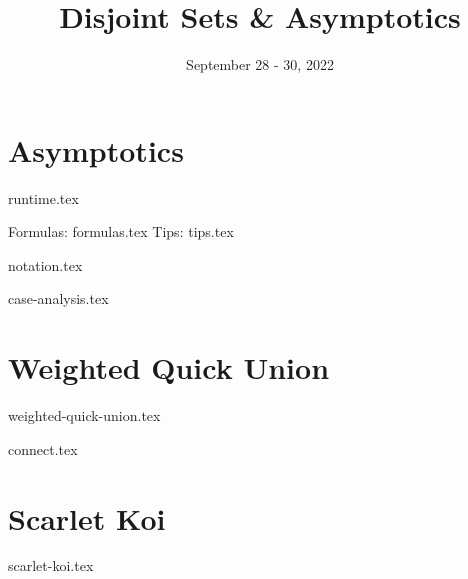 \documentclass[11pt]{exam}
\title{Disjoint Sets \& Asymptotics}
\date{September 28 - 30, 2022}
\begin{document}
\maketitle

\section{Asymptotics}
\begin{questions}
{runtime.tex}

Formulas:
{formulas.tex}
Tips:
{tips.tex}

{notation.tex}

{case-analysis.tex}
\end{questions}

\clearpage

\section{Weighted Quick Union}
{weighted-quick-union.tex}

\begin{questions}
{connect.tex}
\end{questions}

\clearpage

\section{Scarlet Koi}
\begin{questions}
{scarlet-koi.tex}
\end{questions}

\clearpage
\end{document}
